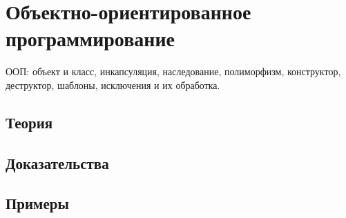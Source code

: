 
\section{Объектно-ориентированное программирование}
\label{sec:2.3b.07-oop}

\begin{ticket}
ООП: объект и класс, инкапсуляция, наследование, полиморфизм, конструктор, деструктор, шаблоны, исключения и их обработка.
\end{ticket}

\subsection*{Теория}

\subsection*{Доказательства}

\subsection*{Примеры}
